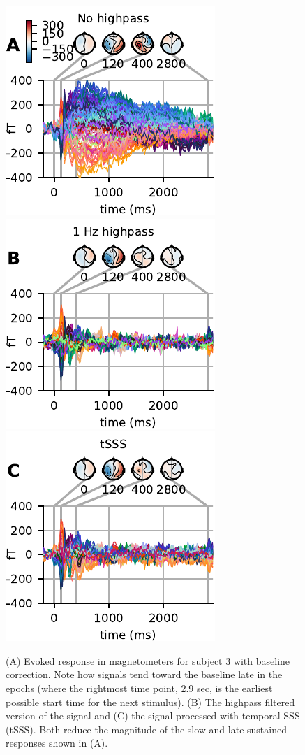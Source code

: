 \begin{figure}[t]
  \centering
  \includegraphics{figures/FanningA.pdf}
  \hspace{1em}
  \includegraphics{figures/FanningB.pdf}
  \hspace{1em}
  \includegraphics{figures/FanningC.pdf}
  \vspace{-10pt}
\caption{(A) Evoked response in magnetometers for subject 3 with baseline correction. Note how signals tend toward the baseline late in the epochs (where the rightmost time point, 2.9 sec, is the earliest possible start time for the next stimulus). (B) The highpass filtered version of the signal and (C) the signal processed with temporal SSS (tSSS). Both reduce the magnitude of the slow and late sustained responses shown in (A).}
\label{fig:fanning}
\end{figure}
  
